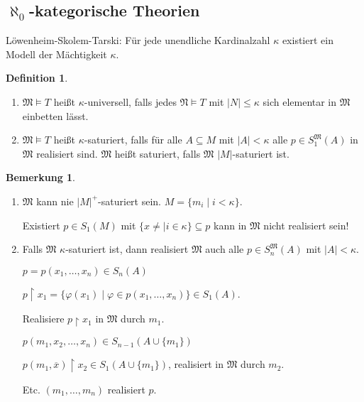 \documentclass[12pt,parskip=full]{scrartcl}
\newcommand{\abs}[1]{{\left| #1 \right|}}
\theoremstyle{definition}
\newtheorem{definition}[theorem]{Definition}
\newtheorem{remark}[theorem]{Bemerkung}
\begin{document}
	\subsection{\texorpdfstring{$\aleph_0$}{Aleph 0}-kategorische Theorien}
	
	Löwenheim-Skolem-Tarski: Für jede unendliche Kardinalzahl $\kappa$ existiert ein Modell der Mächtigkeit $\kappa$.
	
	\begin{definition}
		\begin{enumerate}
			\item $\mathfrak{M} \models T$ heißt $\kappa$-universell, falls jedes $\mathfrak{N} \models T$ mit $\abs{N} \leq \kappa$ sich elementar in $\mathfrak{M}$ einbetten lässt.
			\item $\mathfrak{M} \models T$ heißt $\kappa$-saturiert, falls für alle $A \subseteq M$ mit $\abs{A} < \kappa$ alle $p \in S_1^\mathfrak{M}(A)$ in $\mathfrak{M}$ realisiert sind. $\mathfrak{M}$ heißt saturiert, falls $\mathfrak{M}$ $\abs{M}$-saturiert ist.
		\end{enumerate}
	\end{definition}

	\begin{remark}
		\begin{enumerate}
			\item $\mathfrak{M}$ kann nie $\abs{M}^+$-saturiert sein. $M = \{ m_i \mid i < \kappa \}$.
		
			Existiert $p \in S_1(M)$ mit $\{ x \neq \mid i \in \kappa \} \subseteq p$ kann in $\mathfrak{M}$ nicht realisiert sein!
			
			\item Falls $\mathfrak{M}$ $\kappa$-saturiert ist, dann realisiert $\mathfrak{M}$ auch alle $p \in S_n^\mathfrak{M}(A)$ mit $\abs{A} < \kappa$.
			
			$p = p(x_1, \dots, x_n) \in S_n(A)$
			
			$p \upharpoonright x_1 = \{ \varphi(x_1) \mid \varphi \in p(x_1, \dots, x_n) \} \in S_1(A)$.
			
			Realisiere $p \upharpoonright x_1$ in $\mathfrak{M}$ durch $m_1$.
			
			$p(m_1, x_2, \dots, x_n) \in S_{n-1}(A \cup \{ m_1 \})$
			
			$p(m_1, \overline{x}) \upharpoonright x_2 \in S_1(A \cup \{ m_1 \})$, realisiert in $\mathfrak{M}$ durch $m_2$.
			
			Etc. $(m_1, \dots, m_n)$ realisiert $p$.
		\end{enumerate}
	\end{remark}
\end{document}

